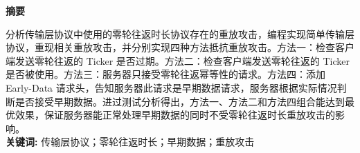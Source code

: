 \setcounter{page}{1}
\begin{center}
   \bfseries 摘\quad 要
\end{center}

    分析传输层协议中使用的零轮往返时长协议存在的重放攻击，编程实现简单传输层协议，重现相关重放攻击，并分别实现四种方法抵抗重放攻击。方法一：检查客户端发送零轮往返的 Ticker 是否过期。方法二：检查客户端发送零轮往返的 Ticker 是否被使用。方法三：服务器只接受零轮往返幂等性的请求。方法四：添加 Early-Data 请求头，告知服务器此请求是早期数据请求，服务器根据实际情况判断是否接受早期数据。进过测试分析得出，方法一、方法二和方法四组合能达到最优效果，保证服务器能正常处理早期数据的同时不受零轮往返时长重放攻击的影响。
    \ \\
    \textbf{关键词: }传输层协议；零轮往返时长；早期数据；重放攻击

\newpage